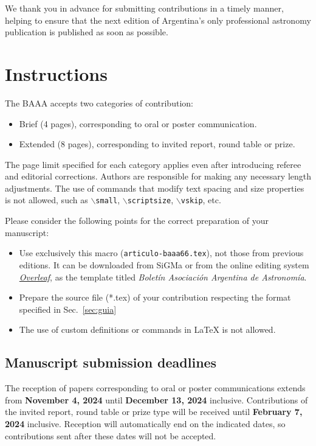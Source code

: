 \documentclass[baaa]{baaa}
\begin{document}
We thank you in advance for submitting contributions in a timely manner, helping to ensure that the next edition of Argentina's only professional astronomy publication is published as soon as possible.

\section{Instructions}

The BAAA accepts two categories of contribution:
\begin{itemize}
    \item Brief (4 pages), corresponding to oral or poster communication.
    \item Extended (8 pages), corresponding to invited report, round table or prize.
\end{itemize}
The page limit specified for each category applies even after introducing referee and editorial corrections. Authors are responsible for making any necessary length adjustments. {The use of commands that modify text spacing and size properties} is not allowed, such as $\backslash${\tt small}, $\backslash${\tt scriptsize}, $\backslash${\tt vskip}, etc.

Please consider the following points for the correct preparation of your manuscript:
\begin{itemize}
    \item Use exclusively this macro ({\tt articulo-baaa66.tex}), not those from previous editions. It can be downloaded from SiGMa or from the online editing system \href{https://www.overleaf.com/}{\emph{Overleaf}}, as the template titled \emph{Boletín Asociación Argentina de Astronomía}.
   \item Prepare the source file (*.tex) of your contribution respecting the format specified in Sec.~\ref{sec:guia}      
   \item The use of custom definitions or commands in \LaTeX{} is not allowed.
\end{itemize}

\subsection{Manuscript submission deadlines}

The reception of papers corresponding to oral or poster communications extends from {\bf November 4, 2024} until {\bf December 13, 2024} inclusive. Contributions of the invited report, round table or prize type will be received until {\bf February 7, 2024} inclusive. Reception will automatically end on the indicated dates, so contributions sent after these dates will not be accepted.
\end{document}
